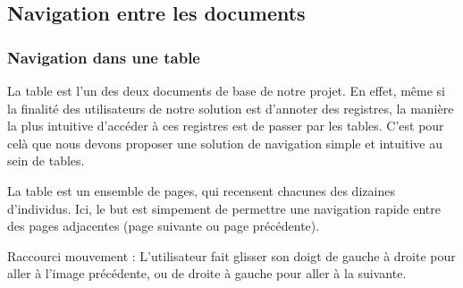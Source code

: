 \documentclass[a4paper]{article}
\begin{document}
\subsection{Navigation entre les documents}

\subsubsection{Navigation dans une table}

La table est l'un des deux documents de base de notre projet. En effet, même si la finalité des utilisateurs de notre solution est d'annoter des registres, la manière la plus intuitive d'accéder à ces registres est de passer par les tables. C'est pour celà que nous devons proposer une solution de navigation simple et intuitive au sein de tables.


La table est un ensemble de pages, qui recensent chacunes des dizaines d'individus. Ici, le but est simpement de permettre une navigation rapide entre des pages adjacentes (page suivante ou page pr\'ec\'edente).

Raccourci mouvement : L'utilisateur fait glisser son doigt de gauche \`a droite pour aller \`a l'image pr\'ec\'edente, ou de droite \`a gauche pour aller \`a la suivante.
\end{document}
